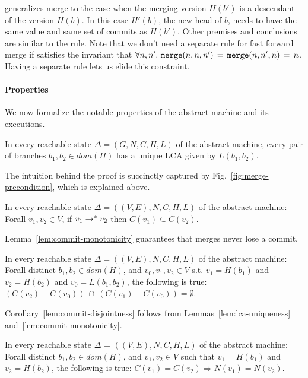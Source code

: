  generalizes merge to the case when the merging
version $H(b')$ is a descendant of the version $H(b)$. In this case
$H'(b)$, the new head of $b$, needs to have the same value and same
set of commits as $H(b')$. Other premises and conclusions are similar
to the  rule. Note that we don't need a separate rule
for fast forward merge if  satisfies the invariant that
$\forall n, n'.~ {\tt merge}(n,n,n') \,=\, {\tt merge}(n,n',n) \,=\, n$.
Having a separate rule lets us elide this constraint.

\paragraph{Properties} We now formalize the notable properties of the
abstract machine and its executions.

\begin{lemma}
  \label{lem:lca-uniqueness}
  In every reachable state $\Delta = (G,N,C,H,L)$ of the abstract
  machine, every pair of branches $b_1, b_2 \in dom(H)$ has a unique
  LCA given by $L(b_1,b_2)$.
\end{lemma}

The intuition behind the proof is succinctly captured by
Fig.~\ref{fig:merge-precondition}, which is explained above.

\begin{lemma}
  \label{lem:commit-monotonicity}
  In every reachable state $\Delta = ((V,E),N,C,H,L)$ of the abstract
  machine: Forall $v_1,v_2 \in V$, if $v_1 \rightarrow^{*} v_2$ then $C(v_1)
  \subseteq C(v_2)$.
\end{lemma}

Lemma~\ref{lem:commit-monotonicity} guarantees that merges never lose
a commit.

\begin{corollary}
  \label{lem:commit-disjointness}
  In every reachable state $\Delta = ((V,E),N,C,H,L)$ of the abstract
  machine: Forall distinct $b_1, b_2 \in dom(H)$, and $v_0, v_1, v_2
  \in V$ s.t.  $v_1 = H(b_1)$ and $v_2 = H(b_2)$ and $v_0 =
  L(b_1,b_2)$, the following is true: $(C(v_2) - C(v_0)) ~\cap~
  (C(v_1) - C(v_0)) = \emptyset$.
\end{corollary}

Corollary~\ref{lem:commit-disjointness} follows from
Lemmas~\ref{lem:lca-uniqueness} and~\ref{lem:commit-monotonicity}.

\begin{theorem}[{\bf Convergence}]
  \label{thm:convergence}
  In every reachable state $\Delta$ = $((V,E),N,C,H,L)$ of the abstract
  machine: Forall distinct $b_1, b_2 \in dom(H)$, and $v_1, v_2 \in V$
  such that $v_1 = H(b_1)$ and $v_2 = H(b_2)$, the following is true:
  $C(v_1) = C(v_2) \Rightarrow N(v_1) = N(v_2)$.
\end{theorem}

